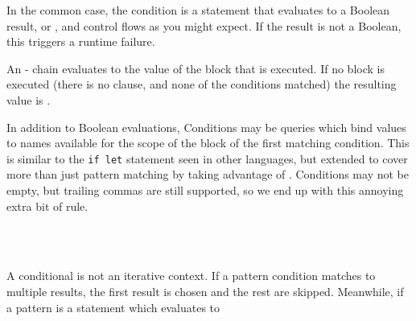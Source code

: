 In the common case, the condition is a statement that evaluates to a Boolean
result,  or , and control flows as you might expect.
If the result is not a Boolean, this triggers a runtime failure.

An - chain evaluates to the value of the block that is executed.
If no block is executed (there is no  clause, and none of the
conditions matched) the resulting value is .

\begin{prooftree}
\end{prooftree}
\begin{prooftree}
\end{prooftree}
\begin{prooftree}
\end{prooftree}
\begin{prooftree}
\end{prooftree}

In addition to Boolean evaluations, Conditions may be queries which bind
values to names available for the scope of the block of the first matching
condition. This is similar to the \texttt{if let} statement seen in other
languages, but extended to cover more than just pattern matching by taking
advantage of \Law{}. Conditions may not be empty, but trailing commas are
still supported, so we end up with this annoying extra bit of rule.

\begin{bnf*}
     \\
     \\
\end{bnf*}

A conditional is not an iterative context. If a pattern condition matches
to multiple results, the first result is chosen and the rest are skipped.
Meanwhile, if a pattern is a statement which evaluates to
